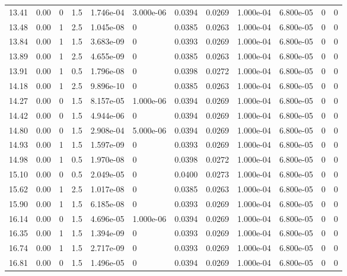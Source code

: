 \documentclass[preview]{standalone}
\begin{document}
{{{\begin{tabular}{L{1.2cm}C{1.2cm} C{0.3cm}C{0.5cm} C{1.4cm}C{1.4cm} C{1.4cm}C{1.4cm} C{1.6cm}C{1.6cm} C{1.6cm}C{1.6cm}}
  13.41  &  0.00  & 0     & 1.5 &  1.746e-04  & 3.000e-06  &  0.0394&   0.0269& 1.000e-04 & 6.800e-05   &  0 & 0  \\ 
  13.48  &  0.00  & 1     & 2.5 &  1.045e-08  & 0  &  0.0385&   0.0263& 1.000e-04 & 6.800e-05   &  0 & 0  \\ 
  13.84  &  0.00  & 1     & 1.5 &  3.683e-09  & 0  &  0.0393&   0.0269& 1.000e-04 & 6.800e-05   &  0 & 0  \\ 
  13.89  &  0.00  & 1     & 2.5 &  4.655e-09  & 0  &  0.0385&   0.0263& 1.000e-04 & 6.800e-05   &  0 & 0  \\ 
  13.91  &  0.00  & 1     & 0.5 &  1.796e-08  & 0  &  0.0398&   0.0272& 1.000e-04 & 6.800e-05   &  0 & 0  \\ 
  14.18  &  0.00  & 1     & 2.5 &  9.896e-10  & 0  &  0.0385&   0.0263& 1.000e-04 & 6.800e-05   &  0 & 0  \\ 
  14.27  &  0.00  & 0     & 1.5 &  8.157e-05  & 1.000e-06  &  0.0394&   0.0269& 1.000e-04 & 6.800e-05   &  0 & 0  \\ 
  14.42  &  0.00  & 0     & 1.5 &  4.944e-06  & 0  &  0.0394&   0.0269& 1.000e-04 & 6.800e-05   &  0 & 0  \\ 
  14.80  &  0.00  & 0     & 1.5 &  2.908e-04  & 5.000e-06  &  0.0394&   0.0269& 1.000e-04 & 6.800e-05   &  0 & 0  \\ 
  14.93  &  0.00  & 1     & 1.5 &  1.597e-09  & 0  &  0.0393&   0.0269& 1.000e-04 & 6.800e-05   &  0 & 0  \\ 
  14.98  &  0.00  & 1     & 0.5 &  1.970e-08  & 0  &  0.0398&   0.0272& 1.000e-04 & 6.800e-05   &  0 & 0  \\ 
  15.10  &  0.00  & 0     & 0.5 &  2.049e-05  & 0  &  0.0400&   0.0273& 1.000e-04 & 6.800e-05   &  0 & 0  \\ 
  15.62  &  0.00  & 1     & 2.5 &  1.017e-08  & 0  &  0.0385&   0.0263& 1.000e-04 & 6.800e-05   &  0 & 0  \\ 
  15.90  &  0.00  & 1     & 1.5 &  6.185e-08  & 0  &  0.0393&   0.0269& 1.000e-04 & 6.800e-05   &  0 & 0  \\ 
  16.14  &  0.00  & 0     & 1.5 &  4.696e-05  & 1.000e-06  &  0.0394&   0.0269& 1.000e-04 & 6.800e-05   &  0 & 0  \\ 
  16.35  &  0.00  & 1     & 1.5 &  1.394e-09  & 0  &  0.0393&   0.0269& 1.000e-04 & 6.800e-05   &  0 & 0  \\ 
  16.74  &  0.00  & 1     & 1.5 &  2.717e-09  & 0  &  0.0393&   0.0269& 1.000e-04 & 6.800e-05   &  0 & 0  \\ 
  16.81  &  0.00  & 0     & 1.5 &  1.496e-05  & 0  &  0.0394&   0.0269& 1.000e-04 & 6.800e-05   &  0 & 0  \\ 

\end{tabular}}}}
\end{document}
